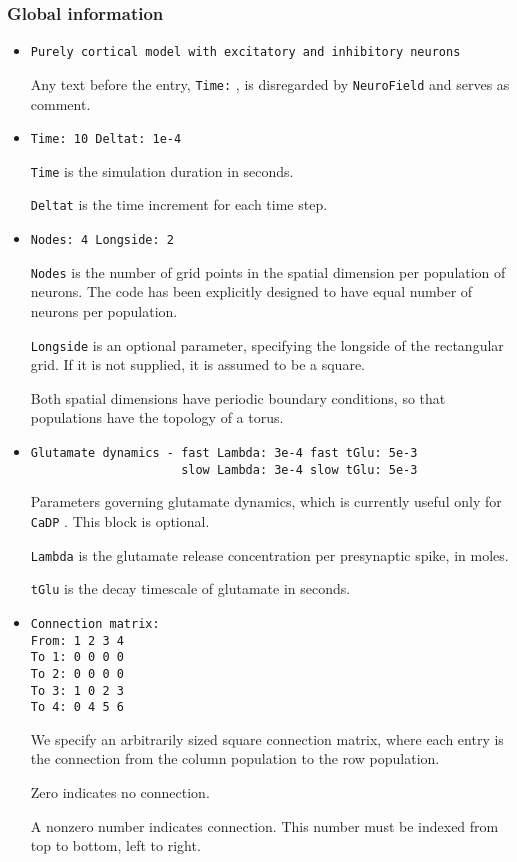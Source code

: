 \documentclass[12pt,a4paper]{article}
\newcommand{\type}[1]{ {\small\small\tt #1} }
\newcommand{\NF}[0]{ \type{NeuroField}}
\begin{document}
\subsubsection{Global information}
\label{sec:global}
\begin{itemize}

\item
\begin{lstlisting}
Purely cortical model with excitatory and inhibitory neurons
\end{lstlisting}
Any text before the entry, \type{Time:}, is disregarded by \NF and serves as comment.
\item
\begin{lstlisting}
Time: 10 Deltat: 1e-4
\end{lstlisting}
\type{Time} is the simulation duration in seconds.

\type{Deltat} is the time increment for each time step.
\item
\begin{lstlisting}
Nodes: 4 Longside: 2
\end{lstlisting}
\type{Nodes} is the number of grid points in the spatial dimension per population of neurons. The code has been explicitly designed to have equal number of neurons per population.

\type{Longside} is an optional parameter, specifying the longside of the rectangular grid. If it is not supplied, it is assumed to be a square.

Both spatial dimensions have periodic boundary conditions, so that populations have the topology of a torus.
\item
\begin{lstlisting}
Glutamate dynamics - fast Lambda: 3e-4 fast tGlu: 5e-3
                     slow Lambda: 3e-4 slow tGlu: 5e-3
\end{lstlisting}
Parameters governing glutamate dynamics, which is currently useful only for \type{CaDP}. This block is optional.

\type{Lambda} is the glutamate release concentration per presynaptic spike, in moles.

\type{tGlu} is the decay timescale of glutamate in seconds.
\item
\begin{lstlisting}
Connection matrix:
From: 1 2 3 4
To 1: 0 0 0 0
To 2: 0 0 0 0
To 3: 1 0 2 3
To 4: 0 4 5 6
\end{lstlisting}
We specify an arbitrarily sized square connection matrix, where each entry is the connection from the column population to the row population.

Zero indicates no connection.

A nonzero number indicates connection. This number must be indexed from top to bottom, left to right.
\end{itemize}
\end{document}
